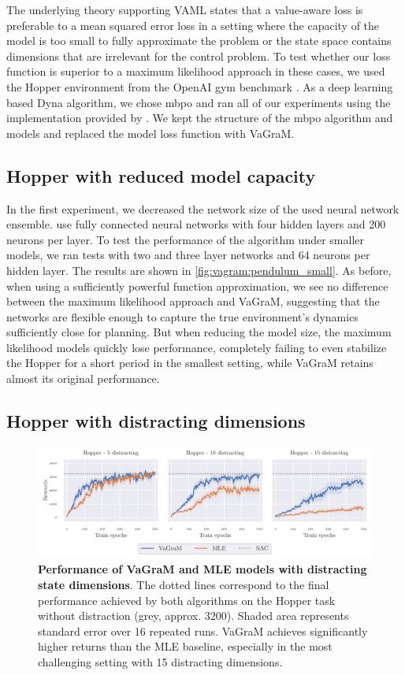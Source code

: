 The underlying theory supporting VAML states that a value-aware loss is preferable to a mean squared error loss in a setting where the capacity of the model is too small to fully approximate the problem or the state space contains dimensions that are irrelevant for the control problem.
To test whether our loss function is superior to a maximum likelihood approach in these cases, we used the Hopper environment from the OpenAI gym benchmark \parencite{brockman2016openai}. 
As a deep learning based Dyna algorithm, we chose \ac{mbpo} \parencite{mbpo} and ran all of our experiments using the implementation provided by \cite{pineda2021mbrl}.
We kept the structure of the \ac{mbpo} algorithm and models and replaced the model loss function with VaGraM.

\subsection{Hopper with reduced model capacity}
In the first experiment, we decreased the network size of the used neural network ensemble.
\cite{mbpo} use fully connected neural networks with four hidden layers and 200 neurons per layer.
To test the performance of the algorithm under smaller models, we ran tests with two and three layer networks and 64 neurons per hidden layer.
The results are shown in \autoref{fig:vagram:pendulum_small}.
As before, when using a sufficiently powerful function approximation, we see no difference between the maximum likelihood approach and VaGraM, suggesting that the networks are flexible enough to capture the true environment's dynamics sufficiently close for planning.
But when reducing the model size, the maximum likelihood models quickly lose performance, completely failing to even stabilize the Hopper for a short period in the smallest setting, while VaGraM retains almost its original performance.

\subsection{Hopper with distracting dimensions}


\begin{figure}[t]
    \includegraphics[clip, trim=0.2cm 0.0cm 0.4cm 0.0cm, width=1.\linewidth]{figures/vagram/fig_1.pdf}
    \caption{\textbf{Performance of VaGraM and MLE models with distracting state dimensions}. The dotted lines correspond to the final performance achieved by both algorithms on the Hopper task without distraction (grey, approx. 3200). Shaded area represents standard error over 16 repeated runs. VaGraM achieves significantly higher returns than the MLE baseline, especially in the most challenging setting with 15 distracting dimensions.}
    \label{fig:vagram:pendulum_distraction}
\end{figure}

